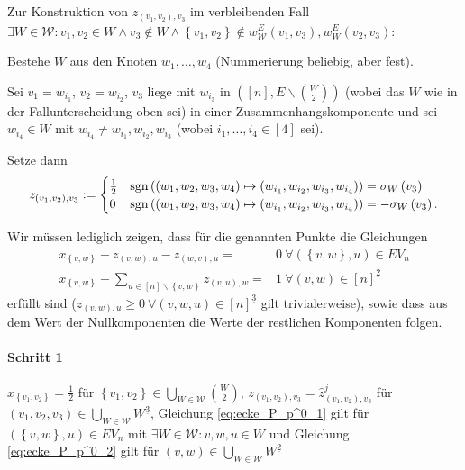\documentclass[10p,a4paper,BCOR = 12mm, DIV=15]{scrbook}
\begin{document}
{\begin{Sa}
Zur Konstruktion von $z_{\left(v_1, v_2\right), v_3}$ im verbleibenden Fall 
$\exists W \in \mathcal{W}: v_1, v_2\in W \wedge v_3 \notin W \wedge \left\{v_1, v_2\right\} \notin w_{\mathcal{W}}^E\left(v_1, v_3\right), w_W^E\left(v_2, v_3\right)$:

Bestehe $W$ aus den Knoten $w_1, \ldots, w_4$ (Nummerierung beliebig, aber fest).

Sei $v_1 = w_{i_1}$, $v_2 = w_{i_2}$, $v_3$ liege mit $w_{i_3}$ in $\left(\left[n\right], E \backslash {W \choose 2}\right)$ (wobei das $W$ wie in der Fallunterscheidung oben sei) in einer Zusammenhangskomponente und sei $w_{i_4} \in W$ mit $w_{i_4} \neq w_{i_1}, w_{i_2}, w_{i_3}$ (wobei $i_1, \ldots, i_4 \in \left[4\right]$ sei).

Setze dann
\begin{displaymath}
z_{\left(v_1, v_2\right), v_3} := \begin{cases}
\frac{1}{2} & \operatorname{sgn} \left(\left(w_1, w_2, w_3, w_4\right) \mapsto \left(w_{i_1}, w_{i_2}, w_{i_3}, w_{i_4}\right)\right) = \sigma_W\left(v_3\right) \\
0 & \operatorname{sgn} \left(\left(w_1, w_2, w_3, w_4\right) \mapsto \left(w_{i_1}, w_{i_2}, w_{i_3}, w_{i_4}\right)\right) = -\sigma_W\left(v_3\right).
\end{cases}
\end{displaymath}
\end{Sa}
\begin{bew}
Wir müssen lediglich zeigen, dass für die genannten Punkte die Gleichungen
\begin{align}
x_{\left\{v, w\right\}} - z_{\left(v, w\right), u} - z_{\left(w, v\right), u} = & 0\ \forall \left(\left\{v, w\right\}, u\right)\in EV_n \label{eq:ecke_P_p^0_1} \\
x_{\left\{v, w\right\}} + \sum_{u\in[n]\backslash\left\{v, w\right\}} z_{\left(v, u\right), w} = & 1\ \forall \left(v, w\right)\in [n]^{\underline{2}} \label{eq:ecke_P_p^0_2}
\end{align}
erfüllt sind ($z_{\left(v, w\right), u} \geq 0 \ \forall \left(v, w, u\right) \in \left[n\right]^{\underline{3}}$ gilt trivialerweise), sowie dass aus dem Wert der Nullkomponenten die Werte der restlichen Komponenten folgen.

\paragraph{Schritt 1} $x_{\left\{v_1, v_2\right\}} = \frac{1}{2}$ für $\left\{v_1, v_2\right\} \in \bigcup_{W \in \mathcal{W}} {W \choose 2}$, $z_{\left(v_1, v_2\right), v_3} = \widehat{z}^{j}_{\left(v_1, v_2\right), v_3}$ für $\left(v_1, v_2, v_3\right) \in \bigcup_{W \in \mathcal{W}} W^{\underline{3}}$, Gleichung \eqref{eq:ecke_P_p^0_1} gilt für $\left(\left\{v, w\right\}, u\right)\in EV_n$ mit $\exists W \in \mathcal{W}: v, w, u \in W$ und Gleichung \eqref{eq:ecke_P_p^0_2} gilt für $\left(v, w\right)\in \bigcup_{W \in \mathcal{W}} W^{\underline{2}}$


\end{bew}}
\end{document}
